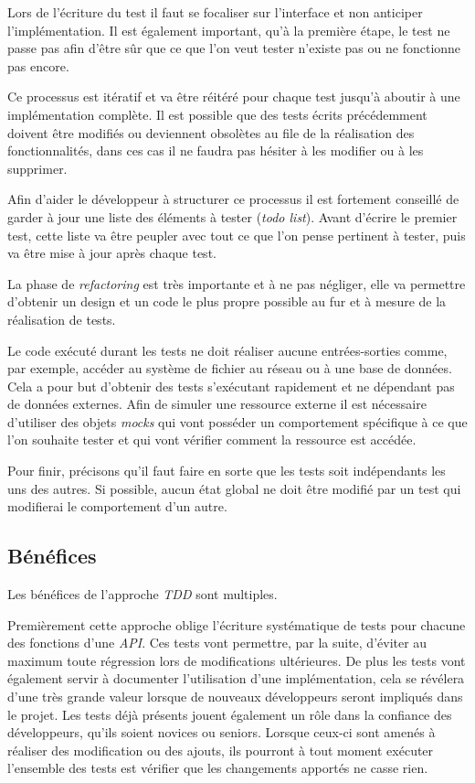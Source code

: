 \documentclass[journal, a4paper, frenchb]{IEEEtran}
\begin{document}
Lors de l'écriture du test il faut se focaliser sur l'interface et non anticiper l'implémentation. Il est également important, qu'à la première étape, le test ne passe pas afin d'être sûr que ce que l'on veut tester n'existe pas ou ne fonctionne pas encore.

Ce processus est itératif et va être réitéré pour chaque test jusqu'à aboutir à une implémentation complète. Il est possible que des tests écrits précédemment doivent être modifiés ou deviennent obsolètes au file de la réalisation des fonctionnalités, dans ces cas il ne faudra pas hésiter à les modifier ou à les supprimer.

Afin d'aider le développeur à structurer ce processus il est fortement conseillé de garder à jour une liste des éléments à tester (\emph{todo list}). Avant d'écrire le premier test, cette liste va être peupler avec tout ce que l'on pense pertinent à tester, puis va être mise à jour après chaque test.

La phase de \emph{refactoring} est très importante et à ne pas négliger, elle va permettre d'obtenir un design et un code le plus propre possible au fur et à mesure de la réalisation de tests.

Le code exécuté durant les tests ne doit réaliser aucune entrées-sorties comme, par exemple, accéder au système de fichier au réseau ou à une base de données. Cela a pour but d'obtenir des tests s'exécutant rapidement et ne dépendant pas de données externes. Afin de simuler une ressource externe il est nécessaire d'utiliser des objets \emph{mocks} qui vont posséder un comportement spécifique à ce que l'on souhaite tester et qui vont vérifier comment la ressource est accédée.

Pour finir, précisons qu'il faut faire en sorte que les tests soit indépendants les uns des autres. Si possible, aucun état global ne doit être modifié par un test qui modifierai le comportement d'un autre.


\subsection{Bénéfices}

Les bénéfices de l'approche \emph{TDD} sont multiples. 

Premièrement cette approche oblige l'écriture systématique de tests pour chacune des fonctions d'une \emph{API}. Ces tests vont permettre, par la suite, d'éviter au maximum toute régression lors de modifications ultérieures. De plus les tests vont également servir à documenter l'utilisation d'une implémentation, cela se révélera d'une très grande valeur lorsque de nouveaux développeurs seront impliqués dans le projet. Les tests déjà présents jouent également un rôle dans la confiance des développeurs, qu'ils soient novices ou seniors. Lorsque ceux-ci sont amenés à réaliser des modification ou des ajouts, ils pourront à tout moment exécuter l'ensemble des tests est vérifier que les changements apportés ne casse rien.
\end{document}
